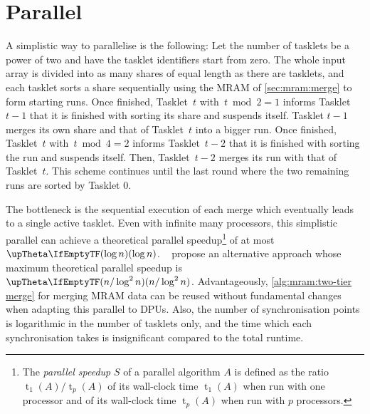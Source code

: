 \section{Parallel \texorpdfstring{\MS{}}{MergeSort}}
\label{sec:mram:par}

A simplistic way to parallelise \MS{} is the following:
Let the number of tasklets be a power of two and have the tasklet identifiers start from zero.
The whole input array is divided into as many shares of equal length as there are tasklets, and each tasklet sorts a share sequentially using the \ac{MRAM} \MS{} of \cref{sec:mram:merge} to form starting runs.
Once finished, Tasklet~\(t\) with~\(t \bmod 2 = 1\) informs Tasklet~\(t - 1\) that it is finished with sorting its share and suspends itself.
Tasklet \(t - 1\) merges its own share and that of Tasklet~\(t\) into a bigger run.
Once finished, Tasklet~\(t\) with~\(t \bmod 4 = 2\) informs Tasklet~\(t - 2\) that it is finished with sorting the run and suspends itself.
Then, Tasklet~\(t - 2\) merges its run with that of Tasklet~\(t\).
This scheme continues until the last round where the two remaining runs are sorted by Tasklet 0.

The bottleneck is the sequential execution of each merge which eventually leads to a single active tasklet.
Even with infinite many processors, this simplistic parallel \MS{} can achieve a theoretical parallel speedup\footnote{
	The \emph{parallel speedup} \(S\) of a parallel algorithm \(A\) is defined as the ratio \(\operatorname{t}_1(A) / \operatorname{t}_p(A)\) of its wall-clock time \(\operatorname{t}_1(A)\) when run with one processor and of its wall-clock time \(\operatorname{t}_p(A)\) when run with \(p\) processors.
} of at most \(\bigtheta{\log n}\).
~\cite{cormen2013algorithmen} propose an alternative approach whose maximum theoretical parallel speedup is \(\bigtheta{n / \log^2 n}\).
Advantageously, \cref{alg:mram:two-tier merge} for merging \ac{MRAM} data can be reused without fundamental changes when adapting this parallel \MS{} to \acp{DPU}.
Also, the number of synchronisation points is logarithmic in the number of tasklets only, and the time which each synchronisation takes is insignificant compared to the total runtime.





